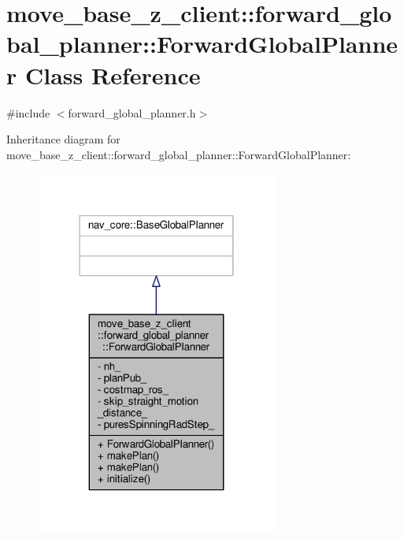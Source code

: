 \hypertarget{classmove__base__z__client_1_1forward__global__planner_1_1ForwardGlobalPlanner}{}\section{move\+\_\+base\+\_\+z\+\_\+client\+:\+:forward\+\_\+global\+\_\+planner\+:\+:Forward\+Global\+Planner Class Reference}
\label{classmove__base__z__client_1_1forward__global__planner_1_1ForwardGlobalPlanner}


{\ttfamily \#include $<$forward\+\_\+global\+\_\+planner.\+h$>$}



Inheritance diagram for move\+\_\+base\+\_\+z\+\_\+client\+:\+:forward\+\_\+global\+\_\+planner\+:\+:Forward\+Global\+Planner\+:\nopagebreak
\begin{figure}[H]
\begin{center}
\leavevmode
\includegraphics[width=226pt]{classmove__base__z__client_1_1forward__global__planner_1_1ForwardGlobalPlanner__inherit__graph}
\end{center}
\end{figure}


